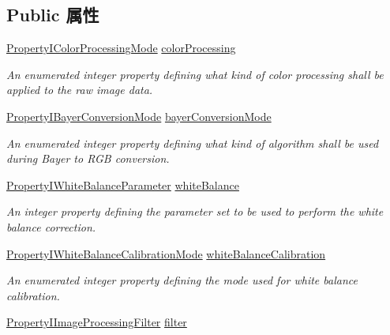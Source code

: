 \subsection*{Public 属性}
\begin{DoxyCompactItemize}
\item 
\hyperlink{group___common_interface_gafa56b00b5309b5cb40e10b9eb07e1cf9}{Property\+I\+Color\+Processing\+Mode} \hyperlink{classmv_i_m_p_a_c_t_1_1acquire_1_1_image_processing_af8773a44e43169a2bdb68b402f4eafd0}{color\+Processing}
\begin{DoxyCompactList}\small\item\em An enumerated integer property defining what kind of color processing shall be applied to the raw image data. \end{DoxyCompactList}\item 
\hyperlink{group___common_interface_ga0420d9b31df0caf0bc62286439e80366}{Property\+I\+Bayer\+Conversion\+Mode} \hyperlink{classmv_i_m_p_a_c_t_1_1acquire_1_1_image_processing_a33f1980b7ef1e3acbe3e0dd67f0ce6d3}{bayer\+Conversion\+Mode}
\begin{DoxyCompactList}\small\item\em An enumerated integer property defining what kind of algorithm shall be used during Bayer to R\+G\+B conversion. \end{DoxyCompactList}\item 
\hyperlink{group___common_interface_gabdf739a9f4db49c6642a3bf50540a1b4}{Property\+I\+White\+Balance\+Parameter} \hyperlink{classmv_i_m_p_a_c_t_1_1acquire_1_1_image_processing_afc417e7cc989db27966d9b267d337e0f}{white\+Balance}
\begin{DoxyCompactList}\small\item\em An integer property defining the parameter set to be used to perform the white balance correction. \end{DoxyCompactList}\item 
\hyperlink{group___common_interface_gab129f1b9a01f41a701fd35fd1fddc4d2}{Property\+I\+White\+Balance\+Calibration\+Mode} \hyperlink{classmv_i_m_p_a_c_t_1_1acquire_1_1_image_processing_a6b158bb26649b95f98f9efef72eddc33}{white\+Balance\+Calibration}
\begin{DoxyCompactList}\small\item\em An enumerated integer property defining the mode used for white balance calibration. \end{DoxyCompactList}\item 
\hyperlink{group___common_interface_ga32f5b5edac93671f54854b4a76f0057e}{Property\+I\+Image\+Processing\+Filter} \hyperlink{classmv_i_m_p_a_c_t_1_1acquire_1_1_image_processing_a5ccbcb292285fef63f625b25239c4164}{filter}

\end{DoxyCompactItemize}
